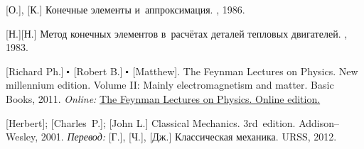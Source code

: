 \begin{thebibliography}{123}
\begin{otherlanguage}{russian}
[О.], [К.] Конечные элементы и~аппроксимация. \mirpublisher, 1986. 

[Н.][Н.] Метод конечных элементов в~расчётах деталей тепловых двигателей. \maschinenbauleningraderverlag, 1983. 

%
%




[Richard Ph.] ${\hspace{-0.2ex}\bigdot}$ [Robert B.] ${\hspace{-0.2ex}\bigdot}$ [Matthew]. The Feynman Lectures on Physics. New millennium edition. Volume II: Mainly electromagnetism and matter. Basic Books, 2011. 
\emph{Online:}
\href{http://www.feynmanlectures.caltech.edu/}{The Feynman Lectures on Physics. Online edition.}

%

[Herbert]; [Charles~P.]; [John L.] Classical Mechanics. 3rd~edition. Addison\hbox{--}Wesley, 2001. 
\emph{Перевод:} [Г.], [Ч.], [Дж.] Классическая механика. URSS, 2012. 


\end{otherlanguage}
\end{thebibliography}
